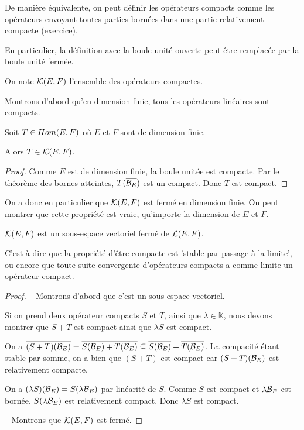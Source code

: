 De manière équivalente, on peut définir les opérateurs compacts comme les
opérateurs envoyant toutes parties bornées dans une partie relativement
compacte (exercice).

En particulier, la définition avec la boule unité ouverte peut
être remplacée par la boule unité fermée.

On note $\mathcal{K}(E, F)$ l'ensemble des opérateurs compactes.

Montrons d'abord qu'en dimension finie, tous les opérateurs linéaires sont
compacts.

\begin{proposition}
	Soit $T \in Hom(E, F)$ où $E$ et $F$ sont de dimension finie.

	Alors $T \in \mathcal{K}(E, F)$.
\end{proposition}

\begin{proof}
	Comme $E$ est de dimension finie, la boule unitée est compacte. Par le
	théorème des bornes atteintes, $T(\overline{\mathcal{B}_{E}})$ est un compact.
	Donc $T$ est compact.
\end{proof}

On a donc en particulier que $\mathcal{K}(E, F)$ est fermé en dimension
finie. On peut montrer que cette propriété est vraie, qu'importe la dimension de
$E$ et $F$.

\begin{proposition}
	$\mathcal{K}(E, F)$ est un sous-espace vectoriel fermé de
	$\mathcal{L}(E, F)$.

	C'est-à-dire que la propriété d'être compacte est 'stable par passage à la
	limite', ou encore que toute suite convergente d'opérateurs compacts a
	comme limite un opérateur compact.
\end{proposition}

\begin{proof}
	-- Montrons d'abord que c'est un sous-espace vectoriel.

	Si on prend deux opérateur compacts $S$ et $T$, ainsi que $\lambda \in
	\mathbb{K}$, nous devons montrer que $S + T$ est compact ainsi que $\lambda S$
	est compact.

	On a $\overline{(S + T)(\mathcal{B}_{E})} =  \overline{S(\mathcal{B}_{E}) +
	T(\mathcal{B}_{E})} \subseteq \overline{S(\mathcal{B}_{E})} +
	\overline{T(\mathcal{B}_{E})}$. La compacité étant stable par somme, on a bien
	que $(S + T)$ est compact car $(S + T)(\mathcal{B}_{E})$ est relativement
	compacte.

	On a $(\lambda S)(\mathcal{B}_{E}) = S(\lambda \mathcal{B}_{E})$ par
	linéarité de $S$. Comme $S$ est compact et $\lambda \mathcal{B}_{E}$ est
	bornée, $S(\lambda \mathcal{B}_{E})$ est relativement compact. Donc
	$\lambda S$ est compact.

	-- Montrons que $\mathcal{K}(E, F)$ est fermé.
\end{proof}

